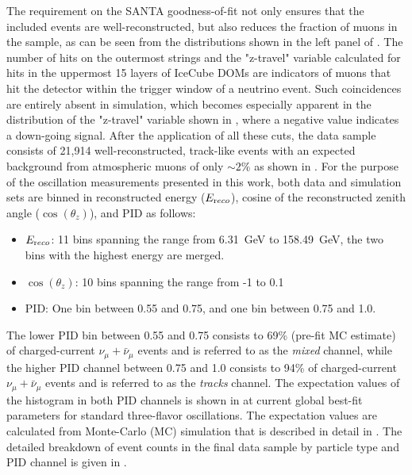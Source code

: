 The requirement on the SANTA goodness-of-fit not only ensures that the included events are well-reconstructed, but also reduces the fraction of muons in the sample, as can be seen from the distributions shown in the left panel of .
The number of hits on the outermost strings and the "z-travel" variable calculated for hits in the uppermost 15 layers of IceCube DOMs are indicators of muons that hit the detector within the trigger window of a neutrino event.
Such coincidences are entirely absent in simulation, which becomes especially apparent in the distribution of the "z-travel" variable shown in , where a negative value indicates a down-going signal.
After the application of all these cuts, the data sample consists of 21,914 well-reconstructed, track-like events with an expected background from atmospheric muons of only $\sim 2\%$ as shown in .
For the purpose of the oscillation measurements presented in this work, both data and simulation sets are binned in reconstructed energy ($E_{\rm reco}$), cosine of the reconstructed zenith angle ($\cos(\theta_z)$), and PID as follows:

\begin{itemize}
    \item $E_{\rm reco}$: 11 bins spanning the range from 6.31~GeV to 158.49~GeV, the two bins with the highest energy are merged.
    \item $\cos(\theta_z)$: 10 bins spanning the range from -1 to 0.1
    \item PID: One bin between 0.55 and 0.75, and one bin between 0.75 and 1.0.
\end{itemize}

The lower PID bin between 0.55 and 0.75 consists to 69\%  (pre-fit MC estimate) of charged-current $\nu_\mu + \bar{\nu}_\mu$ events and is referred to as the \emph{mixed} channel, while the higher PID channel between 0.75 and 1.0 consists to 94\% of charged-current $\nu_\mu + \bar{\nu}_\mu$ events and is referred to as the \emph{tracks} channel.
The expectation values of the histogram in both PID channels is shown in  at current global best-fit parameters for standard three-flavor oscillations.
The expectation values are calculated from Monte-Carlo (MC) simulation that is described in detail in .
The detailed breakdown of event counts in the final data sample by particle type and PID channel is given in .


